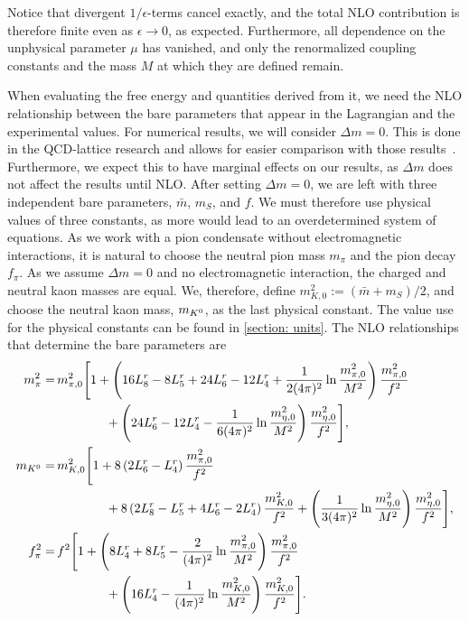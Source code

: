 \endgroup
%
Notice that divergent $1/\epsilon$-terms cancel exactly, and the total NLO contribution is therefore finite even as $\epsilon\rightarrow 0$, as expected.
Furthermore, all dependence on the unphysical parameter $\mu$ has vanished, and only the renormalized coupling constants and the mass $M$ at which they are defined remain.

 When evaluating the free energy and quantities derived from it, we need the NLO relationship between the bare parameters that appear in the Lagrangian and the experimental values.
For numerical results, we will consider $\Delta m = 0$.
This is done in the QCD-lattice research and allows for easier comparison with those results~\autocite{brandtNewClassCompact2018}.
Furthermore, we expect this to have marginal effects on our results, as $\Delta m$ does not affect the results until NLO.
After setting $\Delta m = 0$, we are left with three independent bare parameters, $\bar m$, $m_S$, and $f$.
We must therefore use physical values of three constants, as more would lead to an overdetermined system of equations.
As we work with a pion condensate without electromagnetic interactions, it is natural to choose the neutral pion mass $m_\pi$ and the pion decay $f_\pi$.
As we assume $\Delta m = 0$ and no electromagnetic interaction, the charged and neutral kaon masses are equal.
We, therefore, define $m_{K,0}^2 := (\bar m + m_S)/2$, and choose the neutral kaon mass, $m_{K^0}$, as the last physical constant.
The value use for the physical constants can be found in \autoref{section: units}.
The NLO relationships that determine the bare parameters are~\autocite{gasserChiralPerturbationTheory1985}
%
\begingroup
\allowdisplaybreaks
\begin{align}
    \nonumber
    m_\pi^2 
    =&\, 
    m_{\pi,0}^2
    \Bigg[
        1
        +
        \left(
            16L_8^r - 8L_5^r + 24L_6^r - 12L_4^r
            +
            \frac{1}{2(4\pi)^2}
            \ln\frac{m_{\pi,0}^2}{M^2}
        \right)\frac{m_{\pi,0}^2}{f^2}\\ 
        & \quad\quad\quad\quad
        +
        \left(
            24L_6^r - 12L_4^r
            -
            \frac{1}{6(4\pi)^2}
            \ln\frac{m_{\eta,0}^2}{M^2}
        \right)\frac{m_{\eta,0}^2}{f^2}
    \Bigg], \\
    \nonumber
    m_{{K^0}}
    =&
    \,
    m_{K,0}^2
    \Bigg[
        1
        + 8\left(2L_6^r - L_4^r\right) \frac{m_{\pi,0}^2}{f^2} \\ 
        & \quad\quad\quad\quad
        + 8\left(2L_8^r - L_5^r + 4L_6^r- 2L_4^r\right) \frac{m_{K,0}^2}{f^2}
        +
        \left(        
            \frac{1}{3(4 \pi)^2} 
            \ln\frac{m_{\eta,0}^2}{M^2}
        \right)
        \frac{m_{\eta,0}^2}{f^2}
    \Bigg],\\ \nonumber
    f_\pi^2
    =&\, f^2
    \Bigg[
        1
        + 
        \left(
            8 L_4^r + 8 L_5^r - \frac{2}{(4\pi)^2} \ln\frac{m_{\pi,0}^2}{M^2}
        \right) \frac{m_{\pi,0}^2}{f^2}
        \\ 
        & \quad\quad\quad\quad
        +
        \left(
            16 L_4^r
            - \frac{1}{(4\pi)^2} \ln\frac {m_{K,0}^2}{M^2}
        \right) \frac{m_{K,0}^2}{f^2}
    \Bigg].
\end{align}
